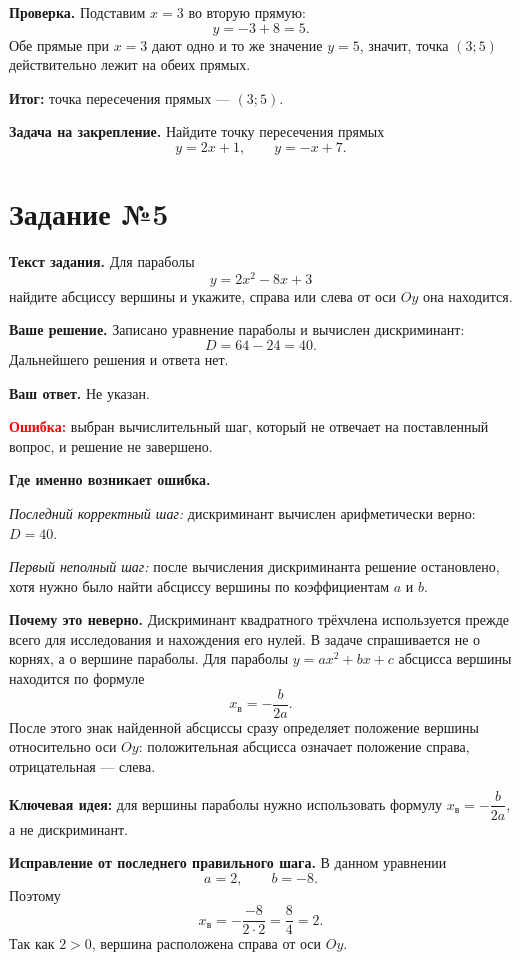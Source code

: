 \documentclass[12pt,a4paper]{article}
\begin{document}
\textbf{Проверка.}
Подставим $x=3$ во вторую прямую:
\[
y=-3+8=5.
\]
Обе прямые при $x=3$ дают одно и то же значение $y=5$, значит, точка $(3;5)$ действительно лежит на обеих прямых.

\textcolor{teal!60!black}{\textbf{Итог:}} точка пересечения прямых --- $(3;5)$.

\textbf{Задача на закрепление.}
Найдите точку пересечения прямых
\[
y=2x+1, \qquad y=-x+7.
\]

\newpage
{}\label{task:5}
\section*{Задание №5}

\textbf{Текст задания.}
Для параболы
\[
y=2x^2-8x+3
\]
найдите абсциссу вершины и укажите, справа или слева от оси $Oy$ она находится.

\textbf{Ваше решение.}
Записано уравнение параболы и вычислен дискриминант:
\[
D=64-24=40.
\]
Дальнейшего решения и ответа нет.

\textbf{Ваш ответ.}
Не указан.

\textcolor{red}{\textbf{Ошибка:}} выбран вычислительный шаг, который не отвечает на поставленный вопрос, и решение не завершено.

\textbf{Где именно возникает ошибка.}

\emph{Последний корректный шаг:} дискриминант вычислен арифметически верно: $D=40$.

\emph{Первый неполный шаг:} после вычисления дискриминанта решение остановлено, хотя нужно было найти абсциссу вершины по коэффициентам $a$ и $b$.

\textbf{Почему это неверно.}
Дискриминант квадратного трёхчлена используется прежде всего для исследования и нахождения его нулей. В задаче спрашивается не о корнях, а о вершине параболы. Для параболы $y=ax^2+bx+c$ абсцисса вершины находится по формуле
\[
x_{\text{в}}=-\frac{b}{2a}.
\]
После этого знак найденной абсциссы сразу определяет положение вершины относительно оси $Oy$: положительная абсцисса означает положение справа, отрицательная --- слева.

\textcolor{blue!60!black}{\textbf{Ключевая идея:}} для вершины параболы нужно использовать формулу $x_{\text{в}}=-\dfrac{b}{2a}$, а не дискриминант.

\textbf{Исправление от последнего правильного шага.}
В данном уравнении
\[
a=2, \qquad b=-8.
\]
Поэтому
\[
x_{\text{в}}=-\frac{-8}{2\cdot 2}=\frac{8}{4}=2.
\]
Так как $2>0$, вершина расположена справа от оси $Oy$.
\end{document}
